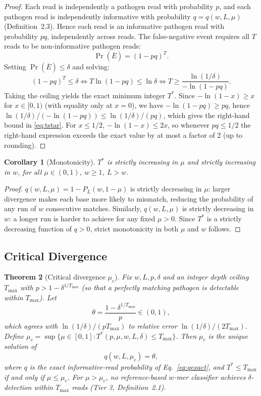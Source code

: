 \documentclass[12pt]{article}
\theoremstyle{definition}
\theoremstyle{plain}
\newtheorem{theorem}{Theorem}[section]
\newtheorem{corollary}[theorem]{Corollary}
\begin{document}
\begin{proof}
Each read is independently a pathogen read with probability $p$, and each
pathogen read is independently informative with probability
$q=q(w,L,\mu)$ (Definition~2.3). Hence each read is an informative pathogen
read with probability $pq$, independently across reads. The false-negative
event requires all $T$ reads to be non-informative pathogen reads:
\[
  \Pr(\overline{E})=(1-pq)^{T}.
\]
Setting $\Pr(\overline{E})\le\delta$ and solving:
\[
  (1-pq)^{T}\le\delta\iff T\ln(1-pq)\le\ln\delta\iff T\ge\frac{\ln(1/\delta)}{-\ln(1-pq)}.
\]
Taking the ceiling yields the exact minimum integer $T^{*}$. Since
$-\ln(1-x)\ge x$ for $x\in[0,1)$ (with equality only at $x=0$), we have
$-\ln(1-pq)\ge pq$, hence $\ln(1/\delta)/(-\ln(1-pq))\le\ln(1/\delta)/(pq)$,
which gives the right-hand bound in \eqref{eq:tstar}. For $x\le 1/2$,
$-\ln(1-x)\le 2x$, so whenever $pq\le 1/2$ the right-hand expression exceeds
the exact value by at most a factor of 2 (up to rounding).
\end{proof}

\begin{corollary}[Monotonicity]\label{cor:mono}
$T^{*}$ is strictly increasing in $\mu$ and strictly increasing in $w$, for
all $\mu\in(0,1)$, $w\ge1$, $L>w$.
\end{corollary}

\begin{proof}
$q(w,L,\mu)=1-P_L(w,1-\mu)$ is strictly decreasing in $\mu$: larger
divergence makes each base more likely to mismatch, reducing the probability
of any run of $w$ consecutive matches. Similarly, $q(w,L,\mu)$ is strictly
decreasing in $w$: a longer run is harder to achieve for any fixed $\mu>0$.
Since $T^{*}$ is a strictly decreasing function of $q>0$, strict monotonicity
in both $\mu$ and $w$ follows.
\end{proof}

\subsection{Critical Divergence}

\begin{theorem}[Critical divergence $\mu_c$]\label{thm:muc}
Fix $w,L,p,\delta$ and an integer depth ceiling $T_{\max}$ with
$p>1-\delta^{1/T_{\max}}$ (so that a perfectly matching pathogen is
detectable within $T_{\max}$). Let
\[
  \theta=\frac{1-\delta^{1/T_{\max}}}{p}\in(0,1),
\]
which agrees with $\ln(1/\delta)/(pT_{\max})$ to relative error
$\ln(1/\delta)/(2T_{\max})$. Define
$\mu_c=\sup\{\mu\in[0,1]:T^{*}(p,\mu,w,L,\delta)\le T_{\max}\}$. Then
$\mu_c$ is the unique solution of
\begin{equation}\label{eq:muc}
  q(w,L,\mu_c)=\theta,
\end{equation}
where $q$ is the exact informative-read probability of
Eq.~\eqref{eq:qexact}, and $T^{*}\le T_{\max}$ if and only if $\mu\le\mu_c$.
For $\mu>\mu_c$, no reference-based $w$-mer classifier achieves
$\delta$-detection within $T_{\max}$ reads (Tier 3, Definition~2.1).
\end{theorem}
\end{document}
